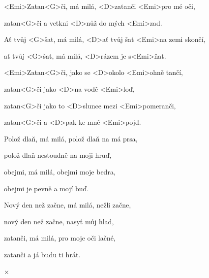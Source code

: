 

\zs
<Emi>Zatan<G>či, má milá, <D>zatanči <Emi>pro mé oči,

zatan<G>či a vetkni <D>nůž do mých <Emi>zad.

Ať tvůj <G>šat, má milá, <D>ať tvůj šat <Emi>na zemi skončí,

ať tvůj <G>šat, má milá, <D>rázem je s<Emi>ňat.
\ks

\zr
<Emi>Zatan<G>či, jako se <D>okolo <Emi>ohně tančí,

zatan<G>či jako <D>na vodě <Emi>loď,

zatan<G>či jako to <D>slunce mezi <Emi>pomeranči,

zatan<G>či a <D>pak ke mně <Emi>pojď.
\kr

\zs
Polož dlaň, má milá, polož dlaň na má prsa,

polož dlaň nestoudně na moji hruď,

obejmi, má milá, obejmi moje bedra,

obejmi je pevně a mojí buď.
\ks

\zr \kr

\zs
Nový den než začne, má milá, nežli začne,

nový den než začne, nasyť můj hlad,

zatanči, má milá, pro moje oči lačné,

zatanči a já budu ti hrát.
\ks

× \kr

\kp
